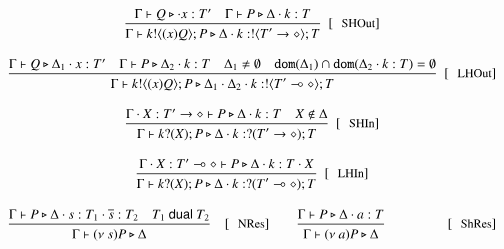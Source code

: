 \[\begin{array}{crccr}

		\multicolumn{5}{c}{
			\tree{
				\Gtprocess{Q}{\cat x:T'} \quad \Gtprocess{P}{\Delta \cat k:T}
			}{
				\Gtprocess{\bout{k}{\abs{x} Q} P}{\Delta \cat k: \btout{\shot{T'}} T}
			}
		\ \ \trule{SHOut}
		}
		\\[7mm]

		\multicolumn{5}{c}{
			\tree{
				\Gtprocess{Q}{\Delta_1 \cat x:T'} \quad \Gtprocess{P}{\Delta_2 \cat k:T}
				\quad
				\Delta_1 \not= \es
				\quad
				\dom{\Delta_1} \cap \dom{\Delta_2 \cat k:T} = \es
			}{
				\Gtprocess{\bout{k}{\abs{x} Q} P}{\Delta_1 \cat \Delta_2 \cat k: \btout{\lhot{T'}} T}
			}
		\ \ \trule{LHOut}
		}
		\\[7mm]




		\multicolumn{5}{c}{
			\tree{
				\tprocess{\Gamma \cat \X: \shot{T'}}{P}{\Delta \cat k: T} \quad \X \notin \Delta
			}{
				\tprocess{\Gamma}{\binp{k}{\X} P}{\Delta \cat k: \btinp{\shot{T'}} T}
			}\ \ \trule{SHIn}
		}
		\\[7mm]

		\multicolumn{5}{c}{
			\tree{
				\tprocess{\Gamma \cat \X: \lhot{T'}}{P}{\Delta \cat k: T \cat X}
			}{
				\tprocess{\Gamma}{\binp{k}{\X} P}{\Delta \cat k: \btinp{\lhot{T'}} T}
			}\ \ \trule{LHIn}
		}
		\\[7mm]


		\tree{
			\Gtprocess{P}{\Delta \cat s:T_1 \cat \dual{s}:T_2} \quad T_1 \dualof T_2
		}{
			\Gtprocess{\news{s} P}{\Delta}
		} & \trule{NRes}
		& &

		\tree{
			\Gtprocess{P}{\Delta \cat a:T}
		}{
			\Gtprocess{\news{a} P}{\Delta}
		} & \trule{ShRes}
		\\[7mm]


\end{array}\]
